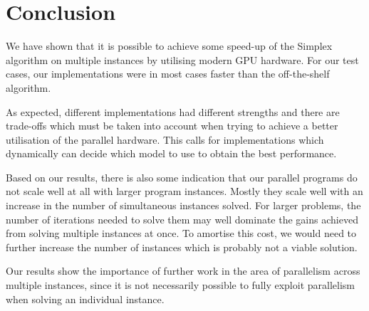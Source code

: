 \section{Conclusion}
We have shown that it is possible to achieve some speed-up of the Simplex algorithm on multiple instances by utilising modern GPU hardware. For our test cases, our implementations were in most cases faster than the off-the-shelf algorithm. 

\newpar
As expected, different implementations had different strengths and there are trade-offs which must be taken into account when trying to achieve a better utilisation of the parallel hardware. This calls for implementations which dynamically can decide which model to use to obtain the best performance.

\newpar
Based on our results, there is also some indication that our parallel programs do not scale well at all with larger program instances. Mostly they scale well with an increase in the number of simultaneous instances solved. For larger problems, the number of iterations needed to solve them may well dominate the gains achieved from solving multiple instances at once. To amortise this cost, we would need to further increase the number of instances which is probably not a viable solution.

\newpar
Our results show the importance of further work in the area of parallelism across multiple instances, since it is not necessarily possible to fully exploit parallelism when solving an individual instance.